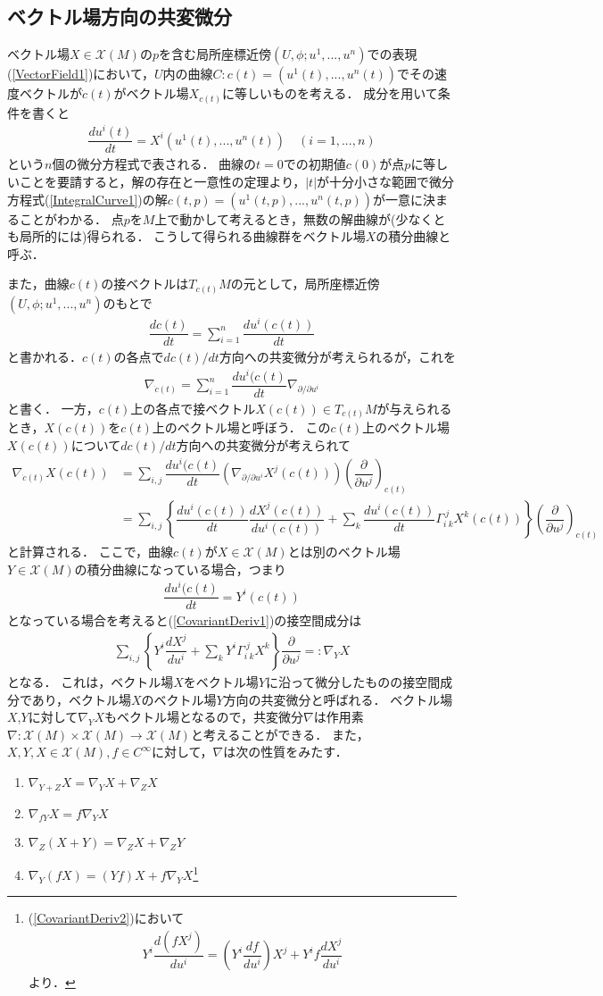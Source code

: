 \documentclass[dvipdfmx, a4paper,10pt]{jsarticle}
\theoremstyle{definition}
\newcommand{\eq}[1]{\begin{align}#1\end{align}}
\newcommand{\enums}[1]{\begin{enumerate}#1\end{enumerate}}
\begin{document}

%
%
\subsection{ベクトル場方向の共変微分}
ベクトル場$X\in\mathscr{X}(M)$の$p$を含む局所座標近傍$(U,\phi;u^1,...,u^n)$での表現(\ref{VectorField1})において，$U$内の曲線$C:c(t)=(u^1(t),...,u^n(t))$でその速度ベクトルが$\dot{c}(t)$がベクトル場$X_{c(t)}$に等しいものを考える．
成分を用いて条件を書くと
\eq{\dfrac{du^i(t)}{dt}=X^i\left(u^1(t),...,u^n(t)\right)\quad(i=1,...,n)\label{IntegralCurve1}}
という$n$個の微分方程式で表される．
曲線の$t=0$での初期値$c(0)$が点$p$に等しいことを要請すると，解の存在と一意性の定理より，$|t|$が十分小さな範囲で微分方程式(\ref{IntegralCurve1})の解$c(t,p)=(u^1(t,p),...,u^n(t,p))$が一意に決まることがわかる．
点$p$を$M$上で動かして考えるとき，無数の解曲線が(少なくとも局所的には)得られる．
こうして得られる曲線群をベクトル場$X$の積分曲線と呼ぶ．

また，曲線$c(t)$の接ベクトルは$T_{c(t)}M$の元として，局所座標近傍$(U,\phi;u^1,...,u^n)$のもとで
\eq{\dfrac{dc(t)}{dt}=\sum_{i=1}^n\dfrac{du^i(c(t))}{dt}}
と書かれる．$c(t)$の各点で$dc(t)/dt$方向への共変微分が考えられるが，これを
\eq{\nabla_{\dot{c}(t)}=\sum_{i=1}^n\dfrac{du^i(c(t)}{dt}\nabla_{\partial/\partial u^i}}
と書く．
一方，$c(t)$上の各点で接ベクトル$X(c(t))\in T_{c(t)}M$が与えられるとき，$X(c(t))$を$c(t)$上のベクトル場と呼ぼう．
この$c(t)$上のベクトル場$X(c(t))$について$dc(t)/dt$方向への共変微分が考えられて
\eq{
	\nabla_{\dot{c}(t)}X(c(t))
		&=\sum_{i,j}\dfrac{du^i(c(t)}{dt}\left(\nabla_{\partial/\partial u^i}X^j(c(t))\right)\left(\dfrac{\partial}{\partial u^j}\right)_{c(t)}\\
		&=\sum_{i,j}\left\{\dfrac{du^i(c(t))}{dt}\dfrac{dX^j(c(t))}{du^i(c(t))}+\sum_{k}\dfrac{du^i(c(t))}{dt}\Gamma_ {i\ k}^{\ j}X^k(c(t))\right\}\left(\dfrac{\partial}{\partial u^j}\right)_{c(t)}
		\label{CovariantDeriv1}
}
と計算される．
ここで，曲線$c(t)$が$X\in\mathscr{X}(M)$とは別のベクトル場$Y\in\mathscr{X}(M)$の積分曲線になっている場合，つまり
\eq{\dfrac{du^i(c(t)}{dt}=Y^i(c(t))}
となっている場合を考えると(\ref{CovariantDeriv1})の接空間成分は
\eq{\sum_{i,j}\left\{Y^i\dfrac{dX^j}{du^i}+\sum_{k}Y^i\Gamma_ {i\ k}^{\ j}X^k\right\}\dfrac{\partial}{\partial u^j}=:\nabla_YX\label{CovariantDeriv2}}
となる．
これは，ベクトル場$X$をベクトル場$Y$に沿って微分したものの接空間成分であり，ベクトル場$X$のベクトル場$Y$方向の共変微分と呼ばれる．
ベクトル場$X$,$Y$に対して$\nabla_YX$もベクトル場となるので，共変微分$\nabla$は作用素$\nabla:\mathscr{X}(M)\times\mathscr{X}(M)\rightarrow\mathscr{X}(M)$と考えることができる．
また，$X,Y,X\in\mathscr{X}(M),f\in C^\infty$に対して，$\nabla$は次の性質をみたす．
\enums{
	\item $\nabla_{Y+Z}X=\nabla_YX+\nabla_ZX$
	\item $\nabla_{fY}X=f\nabla_YX$
	\item $\nabla_Z\left(X+Y\right)=\nabla_ZX+\nabla_ZY$
	\item $\nabla_Y\left(fX\right)=\left(Yf\right)X+f\nabla_YX$\footnote{(\ref{CovariantDeriv2})において\eq{Y^i\dfrac{d(fX^j)}{du^i}=\left(Y^i\dfrac{df}{du^i}\right)X^j+Y^if\dfrac{dX^j}{du^i}}より．}
}
\end{document}
